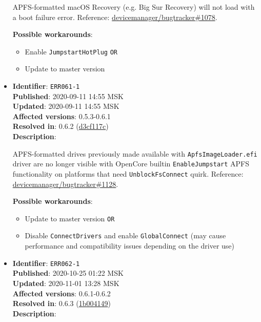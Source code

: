\documentclass[]{article}
\providecommand{\tightlist}{%
  \setlength{\itemsep}{0pt}\setlength{\parskip}{0pt}}
\begin{document}
\begin{itemize}
  APFS-formatted macOS Recovery (e.g. Big Sur Recovery) will not load with a boot failure error. Reference:
  \href{https://github.com/devicemanager/bugtracker/issues/1078}{devicemanager/bugtracker\#1078}.

  \textbf{Possible workarounds}:
  \begin{itemize}
    \tightlist

    \item Enable \texttt{JumpstartHotPlug} \texttt{OR}
    \item Update to master version
  \end{itemize}

\item
  \textbf{Identifier}: \texttt{ERR061-1} \\
  \textbf{Published}: 2020-09-11 14:55 MSK \\
  \textbf{Updated}: 2020-09-11 14:55 MSK \\
  \textbf{Affected versions}: 0.5.3-0.6.1 \\
  \textbf{Resolved in}: 0.6.2 (\href{https://github.com/devicemanager/OpenCorePkg/commit/d3cf117c8661a4eda1863ca1fcdfae5c277974db}{d3cf117c}) \\
  \textbf{Description}:

  APFS-formatted drives previously made available with \texttt{ApfsImageLoader.efi}
  driver are no longer visible with OpenCore builtin \texttt{EnableJumpstart} APFS
  functionality on platforms that need \texttt{UnblockFsConnect} quirk. Reference:
  \href{https://github.com/devicemanager/bugtracker/issues/1128}{devicemanager/bugtracker\#1128}.

  \textbf{Possible workarounds}:
  \begin{itemize}
    \tightlist

    \item Update to master version \texttt{OR}
    \item Disable \texttt{ConnectDrivers} and enable \texttt{GlobalConnect} (may cause
      performance and compatibility issues depending on the driver use)

  \end{itemize}

\item
  \textbf{Identifier}: \texttt{ERR062-1} \\
  \textbf{Published}: 2020-10-25 01:22 MSK \\
  \textbf{Updated}: 2020-11-01 13:28 MSK \\
  \textbf{Affected versions}: 0.6.1-0.6.2 \\
  \textbf{Resolved in}: 0.6.3 (\href{https://github.com/devicemanager/OpenCorePkg/commit/1b0041493d4693f9505aa6415d93079ea59f7ab0}{1b004149}) \\
  \textbf{Description}:


\end{itemize}
\end{document}
